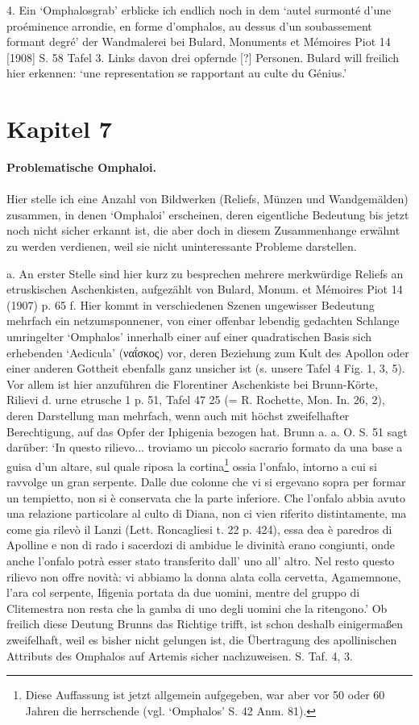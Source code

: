\documentclass[a4paper, 11pt, oneside]{article}
\begin{document}
4. Ein `Omphalosgrab' erblicke ich endlich noch in dem `autel surmonté d'une proéminence arrondie, en forme d'omphalos, au dessus d'un soubassement formant degré' der Wandmalerei bei Bulard, Monuments et Mémoires Piot 14 [1908] S. 58 Tafel 3. Links davon drei opfernde [?] Personen. Bulard will freilich hier erkennen: `une representation se rapportant au culte du Génius.'
\clearpage
\section{Kapitel 7}
\begin{center}
\textbf{Problematische Omphaloi.}
\end{center}
\paragraph{}
Hier stelle ich eine Anzahl von Bildwerken (Reliefs, Münzen und Wandgemälden) zusammen, in denen `Omphaloi' erscheinen, deren eigentliche Bedeutung bis jetzt noch nicht sicher erkannt ist, die aber doch in diesem Zusammenhange erwähnt zu werden verdienen, weil sie nicht uninteressante Probleme darstellen.

a. An erster Stelle sind hier kurz zu besprechen mehrere merkwürdige Reliefs an etruskischen Aschenkisten, aufgezählt von Bulard, Monum. et Mémoires Piot 14 (1907) p. 65 f. Hier kommt in verschiedenen Szenen ungewisser Bedeutung mehrfach ein netzumsponnener, von einer offenbar lebendig gedachten Schlange umringelter `Omphalos' innerhalb einer auf einer quadratischen Basis sich erhebenden `Aedicula' (ναΐσκος) vor, deren Beziehung zum Kult des Apollon oder einer anderen Gottheit ebenfalls ganz unsicher ist (s. unsere Tafel 4 Fig. 1, 3, 5). Vor allem ist hier anzuführen die Florentiner Aschenkiste bei Brunn-Körte, Rilievi d. urne etrusche 1 p. 51, Tafel 47 25 (= R. Rochette, Mon. In. 26, 2), deren Darstellung man mehrfach, wenn auch mit höchst zweifelhafter Berechtigung, auf das Opfer der Iphigenia bezogen hat. Brunn a. a. O. S. 51 sagt darüber: `In questo rilievo... troviamo un piccolo sacrario formato da una base a guisa d'un altare, sul quale riposa la cortina\footnote{Diese Auffassung ist jetzt allgemein aufgegeben, war aber vor 50 oder 60 Jahren die herrschende (vgl. `Omphalos' S. 42 Anm. 81).} ossia l'onfalo, intorno a cui si ravvolge un gran serpente. Dalle due colonne che vi si ergevano sopra per formar un tempietto, non si è conservata che la parte inferiore. Che l'onfalo abbia avuto una relazione particolare al culto di Diana, non ci vien riferito distintamente, ma come gia rilevò il Lanzi (Lett. Roncagliesi t. 22 p. 424), essa dea è paredros di Apolline e non di rado i sacerdozi di ambidue le divinità erano congiunti, onde anche l'onfalo potrà esser stato transferito dall' uno all' altro. Nel resto questo rilievo non offre novità: vi abbiamo la donna alata colla cervetta, Agamemnone, l'ara col serpente, Ifigenia portata da due uomini, mentre del gruppo di Clitemestra non resta che la gamba di uno degli uomini che la ritengono.' Ob freilich diese Deutung Brunns das Richtige trifft, ist schon deshalb einigermaßen zweifelhaft, weil es bisher nicht gelungen ist, die Übertragung des apollinischen Attributs des Omphalos auf Artemis sicher nachzuweisen. S. Taf. 4, 3.
\end{document}
